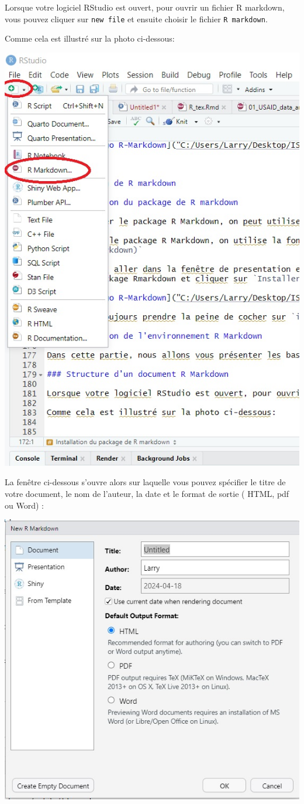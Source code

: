 \documentclass[
  12pt,
]{article}
\begin{document}
Lorsque votre logiciel RStudio est ouvert, pour ouvrir un fichier R
markdown, vous pouvez cliquer sur \texttt{new\ file} et ensuite choisir
le fichier \texttt{R\ markdown}.

Comme cela est illustré sur la photo ci-dessous:

\begin{center}\includegraphics[width=0.6\linewidth,height=0.4\textheight]{../Document_Rmarkdown/Images/Creation_fichier_Rmd} \end{center}

La fenêtre ci-dessous s'ouvre alors sur laquelle vous pouvez spécifier
le titre de votre document, le nom de l'auteur, la date et le format de
sortie ( HTML, pdf ou Word) :

\begin{center}\includegraphics[width=0.6\linewidth,height=0.6\textheight]{../Document_Rmarkdown/Images/New_RMD} \end{center}
\end{document}
